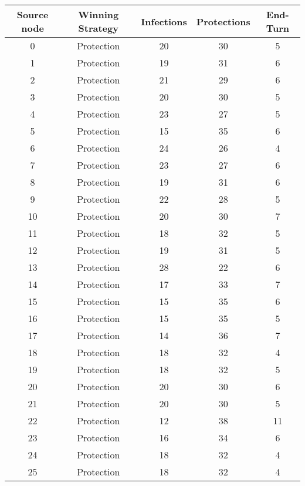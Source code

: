 \documentclass[results.tex]{subfiles}
\begin{document}
\begin{center}
  \begin{tabular}{| c || c | c | c | c |}
    \hline
    {\bfseries Source node} & {\bfseries Winning Strategy} & {\bfseries Infections} & {\bfseries Protections} & {\bfseries End-Turn} \\  %
    \hline\hline
    0 & Protection & 20 & 30 & 5 \\ 
    \hline
    1 & Protection & 19 & 31 & 6 \\ 
    \hline
    2 & Protection & 21 & 29 & 6 \\ 
    \hline
    3 & Protection & 20 & 30 & 5 \\ 
    \hline
    4 & Protection & 23 & 27 & 5 \\ 
    \hline
    5 & Protection & 15 & 35 & 6 \\ 
    \hline
    6 & Protection & 24 & 26 & 4 \\ 
    \hline
    7 & Protection & 23 & 27 & 6 \\ 
    \hline
    8 & Protection & 19 & 31 & 6 \\ 
    \hline
    9 & Protection & 22 & 28 & 5 \\ 
    \hline
    10 & Protection & 20 & 30 & 7 \\ 
    \hline
    11 & Protection & 18 & 32 & 5 \\ 
    \hline
    12 & Protection & 19 & 31 & 5 \\ 
    \hline
    13 & Protection & 28 & 22 & 6 \\ 
    \hline
    14 & Protection & 17 & 33 & 7 \\ 
    \hline
    15 & Protection & 15 & 35 & 6 \\ 
    \hline
    16 & Protection & 15 & 35 & 5 \\ 
    \hline
    17 & Protection & 14 & 36 & 7 \\ 
    \hline
    18 & Protection & 18 & 32 & 4 \\ 
    \hline
    19 & Protection & 18 & 32 & 5 \\ 
    \hline
    20 & Protection & 20 & 30 & 6 \\ 
    \hline
    21 & Protection & 20 & 30 & 5 \\ 
    \hline
    22 & Protection & 12 & 38 & 11 \\ 
    \hline
    23 & Protection & 16 & 34 & 6 \\ 
    \hline
    24 & Protection & 18 & 32 & 4 \\ 
    \hline
    25 & Protection & 18 & 32 & 4 \\ 

\end{tabular}
\end{center}
\end{document}
